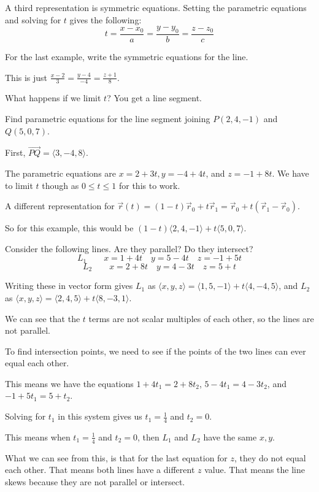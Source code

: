 \documentclass[../calc3.tex]{subfiles}
\begin{document}
A third representation is symmetric equations. Setting the parametric equations and solving for $t$ gives the following:
\[ t = \frac{x-x_0}{a} = \frac{y-y_0}{b} = \frac{z-z_0}{c} \]

\begin{example}
    For the last example, write the symmetric equations for the line.

    This is just $\frac{x-2}{3}=\frac{y-4}{-4}=\frac{z+1}{8}$.
\end{example}
What happens if we limit $t$? You get a line segment.

\begin{example}
    Find parametric equations for the line segment joining $P(2,4,-1)$ and $Q(5,0,7)$.

    First, $\overrightarrow{PQ}=\langle 3,-4,8\rangle$.

    The parametric equations are $x=2+3t, y=-4+4t$, and $z=-1+8t$. We have to limit $t$ though as $0\leq t\leq 1$ for this to work.

    A different representation for $\vec{r}(t)=(1-t)\vec{r}_0+t\vec{r}_1=\vec{r}_0+t(\vec{r}_1-\vec{r}_0)$.

    So for this example, this would be $(1-t)\langle 2,4,-1\rangle + t\langle 5,0,7\rangle$.
\end{example}

\begin{example}
    Consider the following lines. Are they parallel? Do they intersect?
    \[ L_1 \qquad x=1+4t \quad y=5-4t \quad z=-1+5t\]
    \[ L_2 \qquad x=2+8t \quad y=4-3t \quad z=5+t \]

    Writing these in vector form gives $L_1$ as $\langle x,y,z\rangle = \langle 1,5,-1\rangle + t\langle 4,-4,5\rangle$, and $L_2$ as $\langle x,y,z\rangle = \langle 2,4,5\rangle + t\langle 8,-3,1\rangle$.

    We can see that the $t$ terms are not scalar multiples of each other, so the lines are not parallel.

    To find intersection points, we need to see if the points of the two lines can ever equal each other.

    This means we have the equations $1+4t_1=2+8t_2$, $5-4t_1=4-3t_2$, and $-1+5t_1=5+t_2$.

    Solving for $t_1$ in this system gives us $t_1=\frac{1}{4}$ and $t_2=0$.

    This means when $t_1=\frac{1}{4}$ and $t_2=0$, then $L_1$ and $L_2$ have the same $x,y$.

    What we can see from this, is that for the last equation for $z$, they do not equal each other. That means both lines have a different $z$ value. That means the line skews because they are not parallel or intersect.
\end{example}
\end{document}
